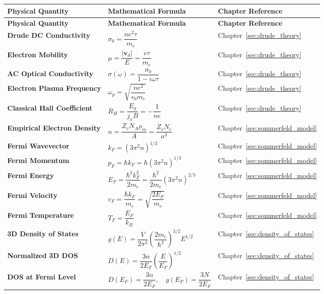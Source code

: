 \documentclass[11pt,a4paper]{article}
\newcommand{\vb}[1]{\mathbf{#1}}
\begin{document}
\begin{longtable}{p{} p{} p{}}
\toprule
\textbf{Physical Quantity} & \textbf{Mathematical Formula} & \textbf{Chapter Reference} \\
\midrule
\endfirsthead
\toprule
\textbf{Physical Quantity} & \textbf{Mathematical Formula} & \textbf{Chapter Reference} \\
\midrule
\endhead
\bottomrule
\endfoot

\textbf{Drude DC Conductivity} & $\sigma_0 = \dfrac{n e^2 \tau}{m_e}$ & Chapter~\ref{sec:drude_theory} \\
\textbf{Electron Mobility} & $\mu = \dfrac{|\vb{v}_d|}{E} = \dfrac{e\tau}{m_e}$ & Chapter~\ref{sec:drude_theory} \\
\textbf{AC Optical Conductivity} & $\sigma(\omega) = \dfrac{\sigma_0}{1 - i\omega\tau}$ & Chapter~\ref{sec:drude_theory} \\
\textbf{Electron Plasma Frequency} & $\omega_p = \sqrt{\dfrac{n e^2}{\epsilon_0 m_e}}$ & Chapter~\ref{sec:drude_theory} \\
\textbf{Classical Hall Coefficient} & $R_H = \dfrac{E_y}{j_x B} = -\dfrac{1}{n e}$ & Chapter~\ref{sec:drude_theory} \\
\textbf{Empirical Electron Density} & $n = \dfrac{Z_v N_A \rho_m}{A} = \dfrac{Z_v N_c}{a^3}$ & Chapter~\ref{sec:sommerfeld_model} \\
\textbf{Fermi Wavevector} & $k_F = (3\pi^2 n)^{1/3}$ & Chapter~\ref{sec:sommerfeld_model} \\
\textbf{Fermi Momentum} & $p_F = \hbar k_F = \hbar(3\pi^2 n)^{1/3}$ & Chapter~\ref{sec:sommerfeld_model} \\
\textbf{Fermi Energy} & $E_F = \dfrac{\hbar^2 k_F^2}{2m_e} = \dfrac{\hbar^2}{2m_e}(3\pi^2 n)^{2/3}$ & Chapter~\ref{sec:sommerfeld_model} \\
\textbf{Fermi Velocity} & $v_F = \dfrac{\hbar k_F}{m_e} = \sqrt{\dfrac{2E_F}{m_e}}$ & Chapter~\ref{sec:sommerfeld_model} \\
\textbf{Fermi Temperature} & $T_F = \dfrac{E_F}{k_B}$ & Chapter~\ref{sec:sommerfeld_model} \\
\textbf{3D Density of States} & $g(E) = \dfrac{V}{2\pi^2}\left(\dfrac{2m_e}{\hbar^2}\right)^{3/2} E^{1/2}$ & Chapter~\ref{sec:density_of_states} \\
\textbf{Normalized 3D DOS} & $D(E) = \dfrac{3n}{2E_F}\left(\dfrac{E}{E_F}\right)^{1/2}$ & Chapter~\ref{sec:density_of_states} \\
\textbf{DOS at Fermi Level} & $D(E_F) = \dfrac{3n}{2E_F}, \quad g(E_F) = \dfrac{3N}{2E_F}$ & Chapter~\ref{sec:density_of_states} \\

\end{longtable}
\end{document}
